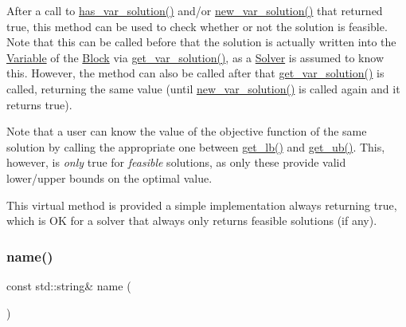 After a call to \mbox{\hyperlink{class_s_m_spp__di__unipi__it_1_1_solver_aa96263f4e0c59225f3f5d54f03fe31ee}{has\+\_\+var\+\_\+solution()}} and/or \mbox{\hyperlink{class_s_m_spp__di__unipi__it_1_1_solver_af109b504a566c90a4ea45c1574c128fe}{new\+\_\+var\+\_\+solution()}} that returned true, this method can be used to check whether or not the solution is feasible. Note that this can be called before that the solution is actually written into the \mbox{\hyperlink{class_s_m_spp__di__unipi__it_1_1_variable}{Variable}} of the \mbox{\hyperlink{class_s_m_spp__di__unipi__it_1_1_block}{Block}} via \mbox{\hyperlink{class_s_m_spp__di__unipi__it_1_1_solver_a91d7cd0dc4fa453406ef30db2bfa37a5}{get\+\_\+var\+\_\+solution()}}, as a \mbox{\hyperlink{class_s_m_spp__di__unipi__it_1_1_solver}{Solver}} is assumed to know this. However, the method can also be called after that \mbox{\hyperlink{class_s_m_spp__di__unipi__it_1_1_solver_a91d7cd0dc4fa453406ef30db2bfa37a5}{get\+\_\+var\+\_\+solution()}} is called, returning the same value (until \mbox{\hyperlink{class_s_m_spp__di__unipi__it_1_1_solver_af109b504a566c90a4ea45c1574c128fe}{new\+\_\+var\+\_\+solution()}} is called again and it returns true).

Note that a user can know the value of the objective function of the same solution by calling the appropriate one between \mbox{\hyperlink{class_s_m_spp__di__unipi__it_1_1_solver_a4a4dbe4c2416d531c4619ca94fc07d31}{get\+\_\+lb()}} and \mbox{\hyperlink{class_s_m_spp__di__unipi__it_1_1_solver_a7304d819b2eeff3d4ba650055b24e3a5}{get\+\_\+ub()}}. This, however, is {\itshape only} true for {\itshape feasible} solutions, as only these provide valid lower/upper bounds on the optimal value.

This virtual method is provided a simple implementation always returning true, which is OK for a solver that always only returns feasible solutions (if any). \mbox{\label{class_s_m_spp__di__unipi__it_1_1_solver_a81dba299d9c4ccc6c1e6be0a845142fd}} 
\subsubsection{\texorpdfstring{name()}{name()}}
{\footnotesize\ttfamily const std\+::string\& name (\begin{DoxyParamCaption}\item[{void}]{ }\end{DoxyParamCaption})\hspace{0.3cm}{\ttfamily [inline]}}



